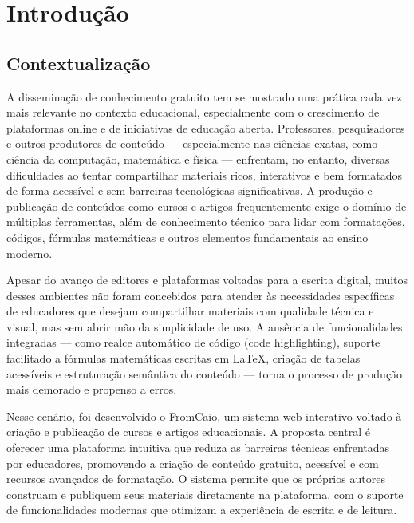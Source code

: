 \chapter{Introdução}\label{cap:intro}

\section{Contextualização}
A disseminação de conhecimento gratuito tem se mostrado uma prática cada vez mais relevante no contexto educacional, especialmente com o crescimento de plataformas online e de iniciativas de educação aberta. Professores, pesquisadores e outros produtores de conteúdo — especialmente nas ciências exatas, como ciência da computação, matemática e física — enfrentam, no entanto, diversas dificuldades ao tentar compartilhar materiais ricos, interativos e bem formatados de forma acessível e sem barreiras tecnológicas significativas. A produção e publicação de conteúdos como cursos e artigos frequentemente exige o domínio de múltiplas ferramentas, além de conhecimento técnico para lidar com formatações, códigos, fórmulas matemáticas e outros elementos fundamentais ao ensino moderno.

%     


Apesar do avanço de editores e plataformas voltadas para a escrita digital, muitos desses ambientes não foram concebidos para atender às necessidades específicas de educadores que desejam compartilhar materiais com qualidade técnica e visual, mas sem abrir mão da simplicidade de uso. A ausência de funcionalidades integradas — como realce automático de código (code highlighting), suporte facilitado a fórmulas matemáticas escritas em LaTeX, criação de tabelas acessíveis e estruturação semântica do conteúdo — torna o processo de produção mais demorado e propenso a erros.

Nesse cenário, foi desenvolvido o FromCaio, um sistema web interativo voltado à criação e publicação de cursos e artigos educacionais. A proposta central é oferecer uma plataforma intuitiva que reduza as barreiras técnicas enfrentadas por educadores, promovendo a criação de conteúdo gratuito, acessível e com recursos avançados de formatação. O sistema permite que os próprios autores construam e publiquem seus materiais diretamente na plataforma, com o suporte de funcionalidades modernas que otimizam a experiência de escrita e de leitura.


